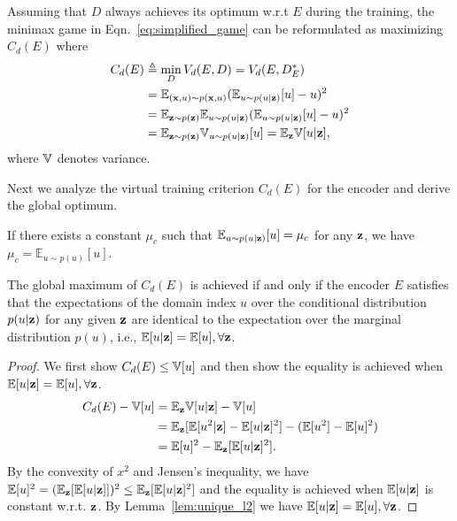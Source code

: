 \documentclass{article}
\newcommand{\lemref}[1]{Lemma~\ref{#1}}
\newcommand{\eqnref}[1]{Eqn.~\ref{#1}}
\begin{document}
Assuming that $D$ always achieves its optimum w.r.t $E$ during the training, the minimax game in \eqnref{eq:simplified_game} can be reformulated as maximizing $C_d(E)$ where
\begin{align*}
C_d(E) & \triangleq \min\limits_D V_d(E,D) = V_d(E,D^*_E)\\
&= \mathbb{E}_{({\bf x},u)\sim p({\bf x},u)} (\mathbb{E}_{u\sim p(u | {\bf z})} [u] - u)^2 \\
&= \mathbb{E}_{{\bf z}\sim p({\bf z})} \mathbb{E}_{u \sim p(u | {\bf z})} (\mathbb{E}_{u\sim p(u | {\bf z})} [u] - u)^2\\
&= \mathbb{E}_{{\bf z}\sim p({\bf z})} {\mathbb V}_{u \sim p(u | {\bf z})}[u] = {\mathbb E}_{\bf z} {\mathbb V}[u|{\bf z}],
\end{align*}
where ${\mathbb V}$ denotes variance.

Next we analyze the virtual training criterion $C_d(E)$ for the encoder and derive the global optimum. 

\begin{lemma}\label{lem:unique_l2}
If there exists a constant $\mu_c$ such that $\mathbb{E}_{u\sim p(u | {\bf z})}[u] = \mu_c$ for any ${\bf z}$, we have $\mu_c = \mathbb{E}_{u\sim p(u)}[u]$.
\end{lemma}

\begin{theorem}\label{thm:iff_l2}
The global maximum of $C_d(E)$ is achieved if and only if the encoder $E$ satisfies that the expectations of the domain index $u$ over the conditional distribution $p(u|{\bf z})$ for any given ${\bf z}$ are identical to the expectation over the marginal distribution $p(u)$, i.e., ${\mathbb E}[u|{\bf z}]={\mathbb E}[u],\forall {\bf z}$.
\end{theorem}
\begin{proof}
We first show $C_d(E) \leq {\mathbb V}[u]$ and then show the equality is achieved when ${\mathbb E}[u|{\bf z}]={\mathbb E}[u],\forall {\bf z}$.
\begingroup\makeatletter\def\f@size{9}\check@mathfonts
\begin{align*}
C_d(E) - {\mathbb V}[u] 
&= {\mathbb E}_{\bf z} {\mathbb V}[u|{\bf z}] - {\mathbb V}[u] \\
&= {\mathbb E}_{\bf z} [{\mathbb E}[u^2|{\bf z}] - {\mathbb E}[u|{\bf z}]^2] - ({\mathbb E}[u^2] - {\mathbb E}[u]^2)\\
&= {\mathbb E}[u]^2 - {\mathbb E}_{\bf z}[{\mathbb E}[u|{\bf z}]^2].
\end{align*}
\endgroup
By the convexity of $x^2$ and Jensen's inequality, we have ${\mathbb E}[u]^2=({\mathbb E}_{\bf z}[{\mathbb E}[u|{\bf z}]])^2 \leq {\mathbb E}_{\bf z}[{\mathbb E}[u|{\bf z}]^2] $ and the equality is achieved when ${\mathbb E}[u|{\bf z}]$ is constant w.r.t. ${\bf z}$. By \lemref{lem:unique_l2} we have ${\mathbb E}[u|{\bf z}]={\mathbb E}[u],\forall {\bf z}$.
\end{proof}
\end{document}
